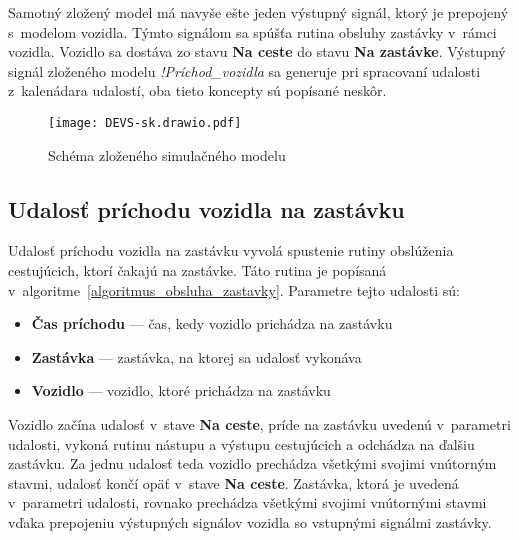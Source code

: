 Samotný zložený model má navyše ešte jeden výstupný signál, ktorý je prepojený s~modelom vozidla.
Týmto signálom sa spúšťa rutina obsluhy zastávky v~rámci vozidla.
Vozidlo sa dostáva zo stavu \textbf{Na ceste} do stavu \textbf{Na zastávke}.
Výstupný signál zloženého modelu \textit{!Príchod\_vozidla} sa generuje pri spracovaní udalosti z~kalenádara udalostí, oba tieto koncepty sú popísané neskôr.

\begin{figure}[h]\label{fig:simulacny_model}
  \centering
  \texttt{[image: DEVS-sk.drawio.pdf]}
  \caption{Schéma zloženého simulačného modelu}
\end{figure}

\subsection*{Udalosť príchodu vozidla na zastávku}
Udalosť príchodu vozidla na zastávku vyvolá spustenie rutiny obslúženia cestujúcich, ktorí čakajú na zastávke. Táto rutina je popísaná v~algoritme~\ref{algoritmus_obsluha_zastavky}.
Parametre tejto udalosti sú:
\begin{itemize}
  \item \textbf{Čas príchodu} --- čas, kedy vozidlo prichádza na zastávku
  \item \textbf{Zastávka} --- zastávka, na ktorej sa udalosť vykonáva
  \item \textbf{Vozidlo} --- vozidlo, ktoré prichádza na zastávku
\end{itemize}

Vozidlo začína udalosť v~stave \textbf{Na ceste}, príde na zastávku uvedenú v~parametri udalosti, vykoná rutinu nástupu a výstupu cestujúcich a odchádza na ďalšiu zastávku.
Za jednu udalosť teda vozidlo prechádza všetkými svojimi vnútorným stavmi, udalosť končí opäť v~stave \textbf{Na ceste}.
Zastávka, ktorá je uvedená v~parametri udalosti, rovnako prechádza všetkými svojimi vnútornými stavmi vďaka prepojeniu výstupných signálov vozidla so vstupnými signálmi zastávky.

